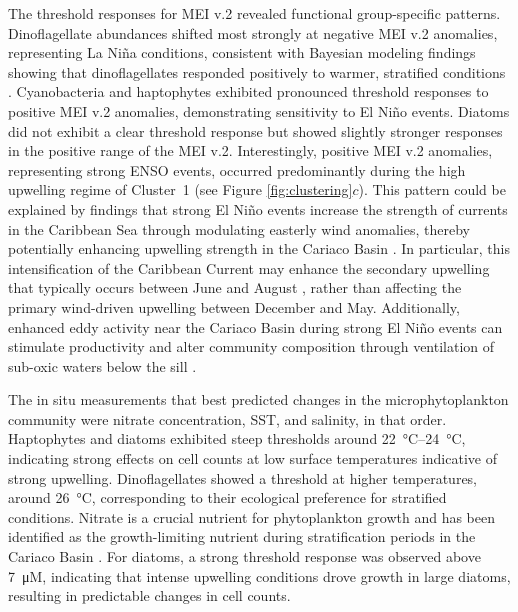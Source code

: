 \documentclass[]{agujournal2019}
\begin{document}
    The threshold responses for MEI v.2 revealed functional group-specific patterns. Dinoflagellate abundances shifted most strongly at negative MEI v.2 anomalies, representing La Niña conditions, consistent with Bayesian modeling findings showing that dinoflagellates responded positively to warmer, stratified conditions \cite{mutshinda_environmental_2013}. Cyanobacteria and haptophytes exhibited pronounced threshold responses to positive MEI v.2 anomalies, demonstrating sensitivity to El Niño events. Diatoms did not exhibit a clear threshold response but showed slightly stronger responses in the positive range of the MEI v.2. Interestingly, positive MEI v.2 anomalies, representing strong ENSO events, occurred predominantly during the high upwelling regime of Cluster~1 (see Figure \ref{fig:clustering}$c$). This pattern could be explained by findings that strong El Niño events increase the strength of currents in the Caribbean Sea through modulating easterly wind anomalies, thereby potentially enhancing upwelling strength in the Cariaco Basin \cite{huang_enso_2023}. In particular, this intensification of the Caribbean Current may enhance the secondary upwelling that typically occurs between June and August \cite{rueda-roa_description_2018}, rather than affecting the primary wind-driven upwelling between December and May.  Additionally, enhanced eddy activity near the Cariaco Basin during strong El Niño events can stimulate productivity and alter community composition through ventilation of sub-oxic waters below the sill \cite{astor_seasonal_2003}.
    
    The in situ measurements that best predicted changes in the microphytoplankton community were nitrate concentration, SST, and salinity, in that order. Haptophytes and diatoms exhibited steep thresholds around \qtyrange{22}{24}{\celsius}, indicating strong effects on cell counts at low surface temperatures indicative of strong upwelling. Dinoflagellates showed a threshold at higher temperatures, around \qty{26}{\celsius}, corresponding to their ecological preference for stratified conditions. Nitrate is a crucial nutrient for phytoplankton growth and has been identified as the growth-limiting nutrient during stratification periods in the Cariaco Basin \cite{muller-karger_scientific_2019}. For diatoms, a strong threshold response was observed above \qty{7}{\micro M}, indicating that intense upwelling conditions drove growth in large diatoms, resulting in predictable changes in cell counts.
\end{document}
